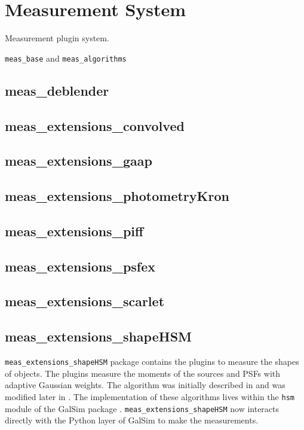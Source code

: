 \section{Measurement System}
\label{sec:meas}

Measurement plugin system.

\texttt{meas\_base} and \texttt{meas\_algorithms}


\subsection{meas\_deblender}
\subsection{meas\_extensions\_convolved}
\subsection{meas\_extensions\_gaap}
\subsection{meas\_extensions\_photometryKron}
\subsection{meas\_extensions\_piff}
\subsection{meas\_extensions\_psfex}
\subsection{meas\_extensions\_scarlet}
\subsection{meas\_extensions\_shapeHSM}
\label{sec:meas_extensions_shapeHSM}
\texttt{meas\_extensions\_shapeHSM} package contains the plugins to measure the shapes of objects.
The plugins measure the moments of the sources and PSFs with adaptive Gaussian weights.
The algorithm was initially described in \cite{2003MNRAS.343..459H} and was modified later in \cite{2005MNRAS.361.1287M}.
The implementation of these algorithms lives within the \texttt{hsm} module of the GalSim package \citep{2015A&C....10..121R}.
\texttt{meas\_extensions\_shapeHSM} now interacts directly with the Python layer of GalSim to make the measurements.

